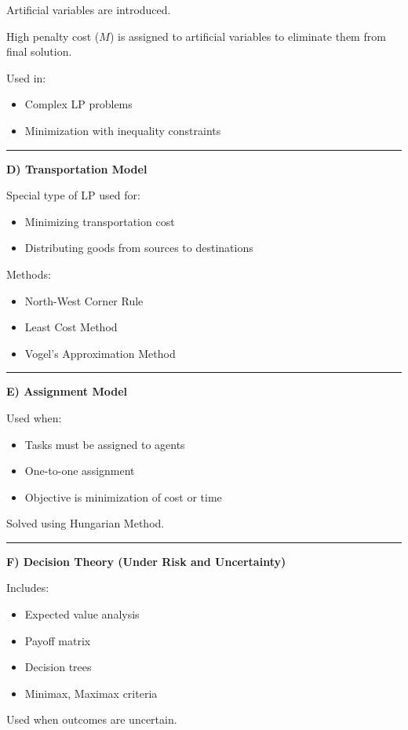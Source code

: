 \documentclass[10pt,a4paper]{article}
\newcommand{\separator}{\vspace{0.4em}\noindent\rule{\linewidth}{0.6pt}\vspace{0.4em}}
\begin{document}
Artificial variables are introduced.

High penalty cost ($M$) is assigned to artificial variables to eliminate them from final
solution.

Used in:
\begin{itemize}
  \item Complex LP problems
  \item Minimization with inequality constraints
\end{itemize}

\separator

\textbf{D) Transportation Model}

Special type of LP used for:
\begin{itemize}
  \item Minimizing transportation cost
  \item Distributing goods from sources to destinations
\end{itemize}

Methods:
\begin{itemize}
  \item North-West Corner Rule
  \item Least Cost Method
  \item Vogel's Approximation Method
\end{itemize}

\separator

\textbf{E) Assignment Model}

Used when:
\begin{itemize}
  \item Tasks must be assigned to agents
  \item One-to-one assignment
  \item Objective is minimization of cost or time
\end{itemize}

Solved using Hungarian Method.

\separator

\textbf{F) Decision Theory (Under Risk and Uncertainty)}

Includes:
\begin{itemize}
  \item Expected value analysis
  \item Payoff matrix
  \item Decision trees
  \item Minimax, Maximax criteria
\end{itemize}

Used when outcomes are uncertain.
\end{document}
